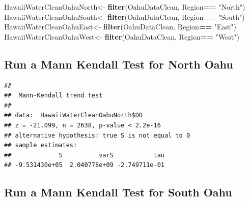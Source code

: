 \documentclass[12pt,]{article}
\newenvironment{Shaded}{\begin{snugshade}}{\end{snugshade}}
\newcommand{\KeywordTok}[1]{\textcolor[rgb]{0.13,0.29,0.53}{\textbf{#1}}}
\newcommand{\StringTok}[1]{\textcolor[rgb]{0.31,0.60,0.02}{#1}}
\newcommand{\OperatorTok}[1]{\textcolor[rgb]{0.81,0.36,0.00}{\textbf{#1}}}
\newcommand{\NormalTok}[1]{#1}
\begin{document}
\begin{Shaded}
\begin{Highlighting}[]
\NormalTok{HawaiiWaterCleanOahuNorth<-}\StringTok{ }\KeywordTok{filter}\NormalTok{(OahuDataClean, Region}\OperatorTok{==}\StringTok{ "North"}\NormalTok{)}
\NormalTok{HawaiiWaterCleanOahuSouth<-}\StringTok{ }\KeywordTok{filter}\NormalTok{(OahuDataClean, Region}\OperatorTok{==}\StringTok{ "South"}\NormalTok{)}
\NormalTok{HawaiiWaterCleanOahuEast<-}\StringTok{ }\KeywordTok{filter}\NormalTok{(OahuDataClean, Region}\OperatorTok{==}\StringTok{ "East"}\NormalTok{)}
\NormalTok{HawaiiWaterCleanOahuWest<-}\StringTok{ }\KeywordTok{filter}\NormalTok{(OahuDataClean, Region}\OperatorTok{==}\StringTok{ "West"}\NormalTok{)}
\end{Highlighting}
\end{Shaded}

\subsection{Run a Mann Kendall Test for North
Oahu}\label{run-a-mann-kendall-test-for-north-oahu}

\begin{Shaded}
\end{Shaded}

\begin{verbatim}
## 
##  Mann-Kendall trend test
## 
## data:  HawaiiWaterCleanOahuNorth$DO
## z = -21.099, n = 2638, p-value < 2.2e-16
## alternative hypothesis: true S is not equal to 0
## sample estimates:
##             S          varS           tau 
## -9.531430e+05  2.040778e+09 -2.749711e-01
\end{verbatim}

\subsection{Run a Mann Kendall Test for South
Oahu}\label{run-a-mann-kendall-test-for-south-oahu}

\begin{Shaded}
\end{Shaded}
\end{document}
